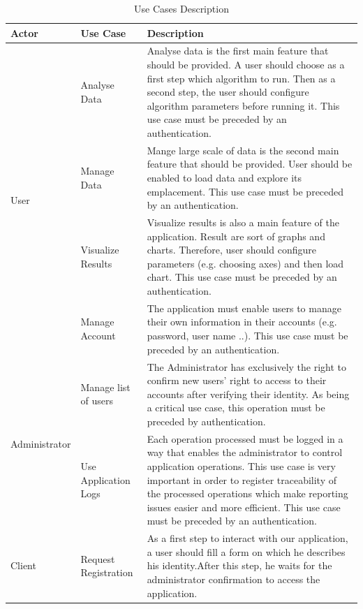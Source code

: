 \begin{table}[H]
\caption{Use Cases Description}
\begin{center}
\begin{tabularx}{17cm}{|p{3.5cm}|X|X|}

\hline
	\textbf{Actor} & \textbf{Use Case} & \textbf{Description} \\ \hline
    \multirow{4}{*}{User}&Analyse  Data&Analyse data is the first main feature that should be provided. \newline A user should choose as a first step which algorithm to run. Then as a second step, the user should configure algorithm parameters before running it. \newline This use case must be preceded by an authentication. \\ \cline{2-3}
    &Manage Data&Mange large scale of data is the second main feature that should be provided. User should be enabled to load data and explore its emplacement. \newline This use case must be preceded by an authentication.\\ \cline{2-3}
    &Visualize Results&Visualize results is also a main feature of the application. Result are sort of graphs and charts. Therefore, user should configure parameters (e.g. choosing axes) and then load chart. \newline This use case must be preceded by an authentication.\\ \cline{2-3}
    &Manage Account&The application must enable users to manage their own information in their accounts (e.g. password, user name ..). \newline This use case must be preceded by an authentication. \\ \hline
    
     
    \multirow{2}{*}{Administrator}&Manage list of users&The Administrator has exclusively the right to confirm new users’ right to access to their accounts after verifying their identity. \newline As being a critical use case, this operation must be preceded by authentication.\\ \cline{2-3}
    &Use Application Logs&Each operation processed must be logged in a way that enables the administrator to control application operations. \newline This use case is very important in order to register traceability of the processed operations which make reporting issues easier and more efficient. \newline This use case must be preceded by an authentication. \\ \hline
    
    
    Client&Request Registration&As a first step to interact with our application, a user should fill a form on which he describes his identity.\newline After this step, he waits for the administrator confirmation to access the application.\\
    \hline
    
\end{tabularx}
\end{center}
\label{description}
\end{table}


